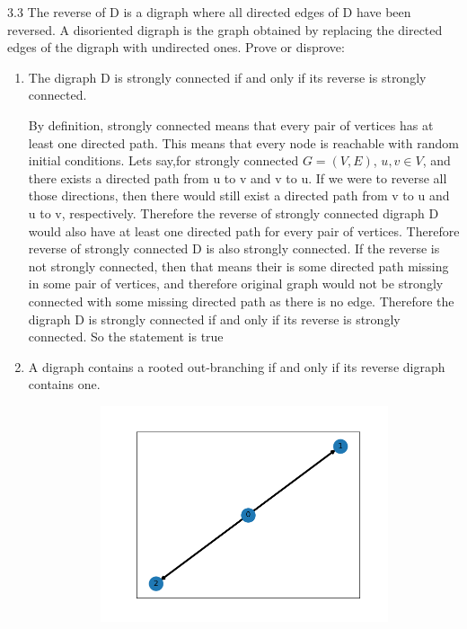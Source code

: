 \documentclass{article}
\begin{document}
\begin{problem}3.3
    The reverse of D is a digraph where all directed edges of D have been reversed. A disoriented digraph is the graph obtained by replacing the directed edges of the digraph with undirected ones. Prove or disprove:
    \begin{enumerate}
        \item The digraph D is strongly connected if and only if its reverse is strongly connected.
        
            By definition, strongly connected means that every pair of vertices has at least one directed path. This means that every node is reachable with random initial conditions. Lets say,for strongly connected $G = (V, E)$, $u,v \in V$, and there exists a directed path from u to v and v to u. If we were to reverse all those directions, then there would still exist a directed path from v to u and u to v, respectively. Therefore the reverse of strongly connected digraph D would also have at least one directed path for every pair of vertices. Therefore reverse of strongly connected D is also strongly connected. 
            If the reverse is not strongly connected, then that means their is some directed path missing in some pair of vertices, and therefore original graph would not be strongly connected with some missing directed path as there is no edge. Therefore the digraph D is strongly connected if and only if its reverse is strongly connected. So the statement is true
        \item A digraph contains a rooted out-branching if and only if its reverse digraph contains one.
        \begin{figure}[!h]
            \centering
            \begin{subfigure}{0.35\textwidth}
                \includegraphics[width=\textwidth]{./img/p2_1.png}

\end{subfigure}
\end{figure}
\end{enumerate}
\end{problem}
\end{document}
